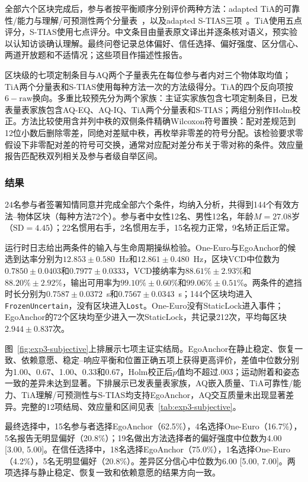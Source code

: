 \documentclass[review]{vgtc}
\begin{document}
全部六个区块完成后，参与者按平衡顺序分别评价两种方法：adapted TiA的可靠性/能力与理解/可预测性两个分量表~\cite{koerber2019tia}，以及adapted S-TIAS三项~\cite{mcgrath2025stias}。TiA使用五点评分，S-TIAS使用七点评分。中文条目由量表原文译出并逐条核对语义，预实验以认知访谈确认理解。最终问卷记录总体偏好、信任选择、偏好强度、区分信心、两道开放题和不适情况；这些项目作描述性报告。

区块级的七项定制条目与AQ两个子量表先在每位参与者内对三个物体取均值；TiA两个分量表和S-TIAS使用每种方法一次的方法级得分。TiA的四个反向项按$6-\mathrm{raw}$换向。多重比较预先分为两个家族：主证实家族包含七项定制条目，已发表量表家族包含AQ-EQ、AQ-IQ、TiA两个分量表和S-TIAS；两组分别作Holm校正。方法比较使用含并列中秩的双侧条件精确Wilcoxon符号置换：配对差规范到12位小数后删除零差，同绝对差赋中秩，再枚举非零差的符号分配。该检验要求零假设下非零配对差的符号可交换，通常对应配对差分布关于零对称的条件。效应量报告匹配秩双列相关及参与者级自举区间。

\subsubsection{结果}

24名参与者签署知情同意并完成全部六个条件，均纳入分析，共得到144个有效方法--物体区块（每种方法72个）。参与者中女性12名、男性12名，年龄$M=27.08$岁（$\mathrm{SD}=4.45$）；22名惯用右手，2名惯用左手，15名视力正常，9名矫正后正常。

运行时日志给出两条件的输入与生命周期操纵检验。One-Euro与EgoAnchor的候选到达率分别为$12.853\pm0.580$~Hz和$12.861\pm0.480$~Hz，区块VCD中位数为$0.7850\pm0.0403$和$0.7977\pm0.0333$，VCD接纳率为$88.61\%\pm2.93\%$和$88.20\%\pm2.92\%$，输出可用率为$99.10\%\pm0.60\%$和$99.06\%\pm0.51\%$。两条件的遮挡时长分别为$0.7587\pm0.0372$~s和$0.7567\pm0.0343$~s；144个区块均进入\texttt{FrozenUncertain}，没有区块进入\texttt{Lost}。One-Euro没有StaticLock进入事件；EgoAnchor的72个区块均至少进入一次StaticLock，共记录212次，平均每区块$2.944\pm0.837$次。

图~\ref{fig:exp3-subjective}上排展示七项主证实结局。EgoAnchor在静止稳定、恢复一致、依赖意愿、稳定--响应平衡和位置正确五项上获得更高评价，差值中位数分别为1.00、0.67、1.00、0.33和0.67，Holm校正后$p$值均不超过.003；运动附着和姿态一致的差异未达到显著。下排展示已发表量表家族，AQ嵌入质量、TiA可靠性/能力、TiA理解/可预测性与S-TIAS均支持EgoAnchor，AQ交互质量未出现显著差异。完整的12项结局、效应量和区间见表~\ref{tab:exp3-subjective}。

最终选择中，15名参与者选择EgoAnchor（62.5\%），4名选择One-Euro（16.7\%），5名报告无明显偏好（20.8\%）；19名做出方法选择者的偏好强度中位数为4.00 [3.00, 5.00]。在信任选择中，18名选择EgoAnchor（75.0\%），1名选择One-Euro（4.2\%），5名无明显偏好（20.8\%）。差异区分信心中位数为6.00 [5.00, 7.00]。两项选择与静止稳定、恢复一致和依赖意愿的结果方向一致。
\end{document}
